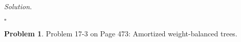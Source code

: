 \documentclass[11pt]{article}
\theoremstyle{definition}
\newtheorem{problem}{Problem}
\newenvironment{solution}{\noindent\emph{Solution.}}{\hfill$\square$}
\begin{document}
\begin{solution}
\begin{enumerate}
\begin{enumerate}
   

    		


\end{enumerate}
\end{enumerate}


\end{solution}


\newpage



\begin{problem}
Problem 17-3 on Page 473: Amortized weight-balanced trees.
\end{problem}
\end{document}
